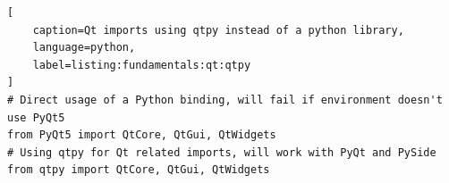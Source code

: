 \begin{lstlisting}[
    caption=Qt imports using qtpy instead of a python library,
    language=python, 
    label=listing:fundamentals:qt:qtpy
]
# Direct usage of a Python binding, will fail if environment doesn't use PyQt5
from PyQt5 import QtCore, QtGui, QtWidgets
# Using qtpy for Qt related imports, will work with PyQt and PySide
from qtpy import QtCore, QtGui, QtWidgets
\end{lstlisting}

